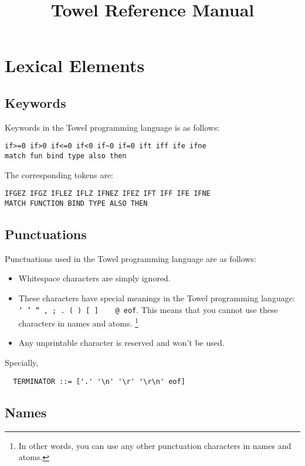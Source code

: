 \documentclass{book}
\title{Towel Reference Manual}
\begin{document}
\maketitle
\tableofcontents

\chapter{Lexical Elements}\label{chap:grammar}
\section{Keywords}

Keywords in the Towel programming language is as follows:
\begin{verbatim}
if>=0 if>0 if<=0 if<0 if~0 if=0 ift iff ife ifne
match fun bind type also then
\end{verbatim}

The corresponding tokens are:
\begin{verbatim}
IFGEZ IFGZ IFLEZ IFLZ IFNEZ IFEZ IFT IFF IFE IFNE
MATCH FUNCTION BIND TYPE ALSO THEN
\end{verbatim}

\section{Punctuations}

Punctuations used in the Towel programming language are as follows:

\begin{itemize}
\item Whitespace characters are simply ignored.
\item These characters have special meanings in the Towel programming language: \texttt{` ' `` , ; . ( ) [ ] { } \ @ eof}. This means that you cannot use these characters in names and atoms. \footnote{In other words, you can use any other punctuation characters in names and atoms.}
\item Any unprintable character is reserved and won't be used.
\end{itemize}

Specially,
\begin{verbatim}
  TERMINATOR ::= ['.' '\n' '\r' '\r\n' eof]
\end{verbatim}

\section{Names}
\end{document}
